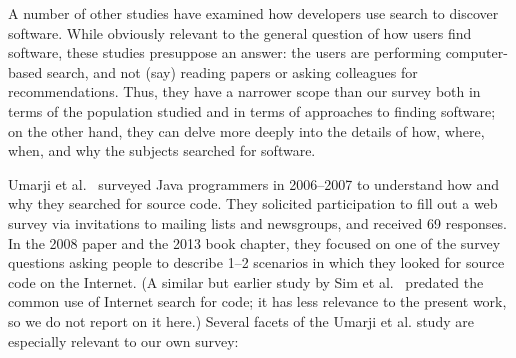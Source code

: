 \documentclass{casicswhitepaper}
\begin{document}
A number of other studies have examined how developers use search to discover software.  While obviously relevant to the general question of how users find software, these studies presuppose an answer: the users are performing computer-based search, and not (say) reading papers or asking colleagues for recommendations.  Thus, they have a narrower scope than our survey both in terms of the population studied and in terms of approaches to finding software; on the other hand, they can delve more deeply into the details of how, where, when, and why the subjects searched for software.

Umarji et al.~\cite{umarji_2008, umarji_2013} surveyed Java programmers in 2006--2007 to understand how and why they searched for source code.  They solicited participation to fill out a web survey via invitations to mailing lists and newsgroups, and received 69 responses.  In the 2008 paper and the 2013 book chapter, they focused on one of the survey questions asking people to describe 1--2 scenarios in which they looked for source code on the Internet.  (A similar but earlier study by Sim et al.~\cite{sim_1998} predated the common use of Internet search for code; it has less relevance to the present work, so we do not report on it here.)  Several facets of the Umarji et al. study are especially relevant to our own survey:
\end{document}

